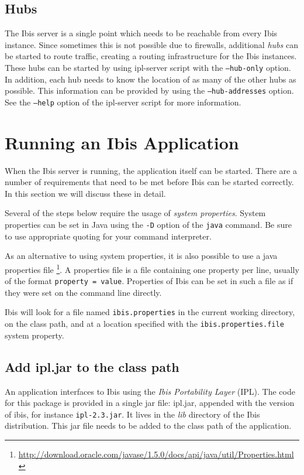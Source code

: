 \documentclass[a4paper,10pt]{article}
\begin{document}
\subsection{Hubs}
\label{hubs}

The Ibis server is a single point which needs to be reachable from every
Ibis instance. Since sometimes this is not possible due to firewalls,
additional \emph{hubs} can be started to route traffic, creating a
routing infrastructure for the Ibis instances. These hubs can be started
by using ipl-server script with the \texttt{--hub-only} option. In
addition, each hub needs to know the location of as many of the other
hubs as possible. This information can be provided by using the
\texttt{--hub-addresses} option. See the \texttt{--help} option of the
ipl-server script for more information.

\section{Running an Ibis Application}

When the Ibis server is running, the application itself can be
started. There are a number of requirements that need to be met before 
Ibis can be started correctly. In this section we will discuss these in detail.

Several of the steps below require the usage of \emph{system properties}. 
System properties can be set in Java using the \texttt{-D} option of the 
\texttt{java} command. Be sure to use appropriate quoting for your
command interpreter.

As an alternative to using system properties, it is also possible to use
a java properties file
\footnote{\url{http://download.oracle.com/javase/1.5.0/docs/api/java/util/Properties.html}}.
A properties file is a file containing one property per line, usually of
the format \texttt{property = value}. Properties of Ibis can be set in
such a file as if they were set on the command line directly.

Ibis will look for a file named \texttt{ibis.properties} in the current working
directory, on the class path, and at a location specified with the
\texttt{ibis.properties.file} system property.

\subsection{Add ipl.jar to the class path}

An application interfaces to Ibis using the \emph{Ibis Portability Layer} (IPL).
The code for this package is provided in a single jar file:
ipl.jar, appended with the version of ibis, for instance \texttt{ipl-2.3.jar}.
It lives in the \emph{lib} directory of the Ibis distribution.
This jar file needs to be added to the class path of the application.
\end{document}
